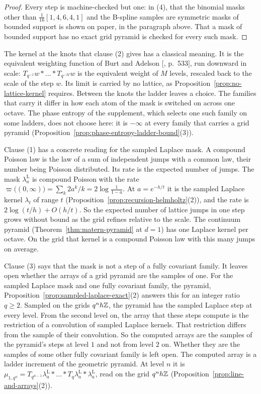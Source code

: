 \begin{proof}
Every step is machine-checked but one: in (4), that the binomial masks other than
$\tfrac1{16}[1,4,6,4,1]$ and the B-spline samples are symmetric masks of bounded support is shown on
paper, in the paragraph above. That a mask of bounded support has no exact grid pyramid is checked
for every such mask.
\end{proof}

The kernel at the knots that clause (2) gives has a classical meaning. It is the equivalent
weighting function of Burt and Adelson [, p.~533], run downward in scale:
$T_{q^{-1}}w * \dots * T_{q^{-M}}w$ is the equivalent weight of $M$ levels, rescaled back to the
scale of the step $w$. Its limit is carried by no lattice, as Proposition~\ref{prop:no-lattice-kernel} requires.
Between the knots the ladder leaves a choice. The families that carry it differ in how each atom of
the mask is switched on across one octave. The phase entropy of the supplement, which selects one
such family on some ladders, does not choose here: it is $-\infty$ at every family that carries a
grid pyramid (Proposition~\ref{prop:phase-entropy-ladder-bound}(3)).

Clause (1) has a concrete reading for the sampled Laplace mask. A compound Poisson law
is the law of a sum of independent jumps with a common law, their number being Poisson distributed.
Its rate is the expected number of jumps. The mask $\lambda^{\mathrm{L}}_a$ is compound Poisson
with the rate $\varpi\bigl((0,\infty)\bigr) = \sum_k2a^k/k = 2\log\tfrac{1}{1-a}$. At
$a = e^{-h/t}$ it is the sampled Laplace kernel $\lambda_t$ of range $t$
(Proposition~\ref{prop:recursion-helmholtz}(2)), and the rate is $2\log(t/h) + O(h/t)$. So the
expected number of lattice jumps in one step grows without bound as the grid refines relative to
the scale. The continuum \Matern{} pyramid (Theorem~\ref{thm:matern-pyramid} at $d = 1$) has one
Laplace kernel per octave. On the grid that kernel is a compound Poisson law with this many jumps on
average.

Clause (3) says that the mask is not a step of a fully covariant family. It leaves open whether
the arrays of a grid pyramid are the samples of one. For the sampled Laplace mask and one fully
covariant family, the \Matern{} pyramid, Proposition~\ref{prop:sampled-laplace-exact}(2) answers
this for an integer ratio $q \ge 2$. Sampled on the grids $q^nh\mathbb{Z}$, the \Matern{} pyramid has the
sampled Laplace step at every level. From the second level on, the array that these steps compute
is the restriction of a convolution of sampled Laplace kernels. That restriction differs from the
sample of their convolution. So the computed arrays are the samples of the \Matern{} pyramid's
steps at level $1$ and not from level $2$ on. Whether they are the samples of some other fully
covariant family is left open. The computed array is a ladder increment of the geometric pyramid.
At level $n$ it is $\mu_{1,q^n} = T_{q^{n-1}}\lambda^{\mathrm{L}}_a * \dots * T_q\lambda^{\mathrm{L}}_a *
\lambda^{\mathrm{L}}_a$, read on the grid $q^nh\mathbb{Z}$ (Proposition~\ref{prop:line-and-arrays}(2)).

